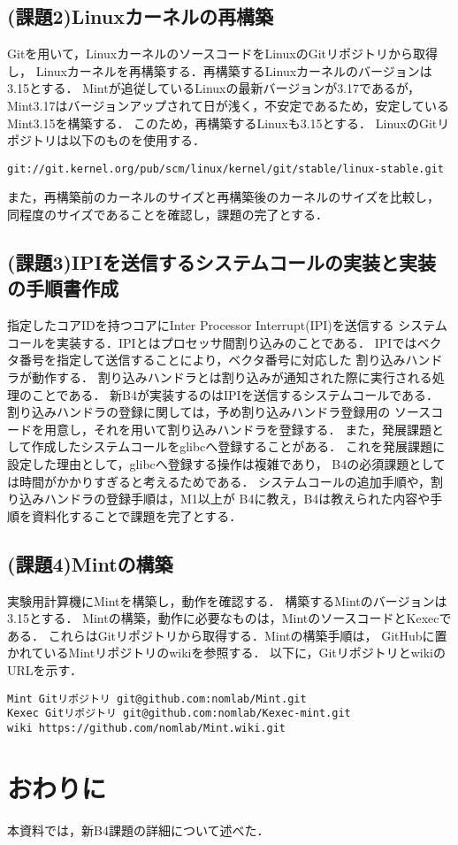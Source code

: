 \documentclass[12pt]{jsarticle}
\begin{document}
\subsection{(課題2)Linuxカーネルの再構築}
Gitを用いて，LinuxカーネルのソースコードをLinuxのGitリポジトリから取得し，
Linuxカーネルを再構築する．再構築するLinuxカーネルのバージョンは3.15とする．
Mintが追従しているLinuxの最新バージョンが3.17であるが，
Mint3.17はバージョンアップされて日が浅く，不安定であるため，安定しているMint3.15を構築する．
このため，再構築するLinuxも3.15とする．
LinuxのGitリポジトリは以下のものを使用する．
\begin{verbatim}
git://git.kernel.org/pub/scm/linux/kernel/git/stable/linux-stable.git
\end{verbatim}
また，再構築前のカーネルのサイズと再構築後のカーネルのサイズを比較し，
同程度のサイズであることを確認し，課題の完了とする．
\subsection{(課題3)IPIを送信するシステムコールの実装と実装の手順書作成}
指定したコアIDを持つコアにInter Processor Interrupt(IPI)を送信する
システムコールを実装する．IPIとはプロセッサ間割り込みのことである．
IPIではベクタ番号を指定して送信することにより，ベクタ番号に対応した
割り込みハンドラが動作する．
割り込みハンドラとは割り込みが通知された際に実行される処理のことである．
新B4が実装するのはIPIを送信するシステムコールである．
割り込みハンドラの登録に関しては，予め割り込みハンドラ登録用の
ソースコードを用意し，それを用いて割り込みハンドラを登録する．
また，発展課題として作成したシステムコールをglibcへ登録することがある．
これを発展課題に設定した理由として，glibcへ登録する操作は複雑であり，
B4の必須課題としては時間がかかりすぎると考えるためである．
システムコールの追加手順や，割り込みハンドラの登録手順は，M1以上が
B4に教え，B4は教えられた内容や手順を資料化することで課題を完了とする．
\subsection{(課題4)Mintの構築}
実験用計算機にMintを構築し，動作を確認する．
構築するMintのバージョンは3.15とする．
Mintの構築，動作に必要なものは，MintのソースコードとKexecである．
これらはGitリポジトリから取得する．Mintの構築手順は，
GitHubに置かれているMintリポジトリのwikiを参照する．
以下に，GitリポジトリとwikiのURLを示す．
\begin{verbatim}
Mint Gitリポジトリ git@github.com:nomlab/Mint.git
Kexec Gitリポジトリ git@github.com:nomlab/Kexec-mint.git
wiki https://github.com/nomlab/Mint.wiki.git
\end{verbatim}
\section{おわりに}
本資料では，新B4課題の詳細について述べた．
\end{document}
